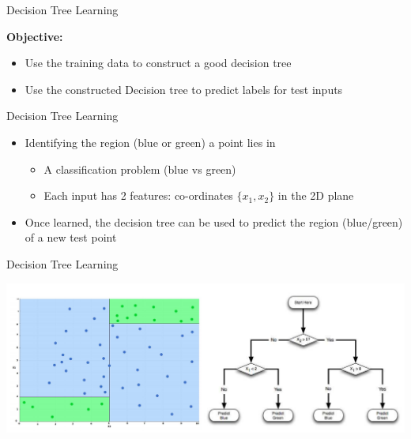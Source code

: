 \documentclass{beamer}
\begin{document}
\begin{frame}{Decision Tree Learning}

    {\bf Objective:} 
    \begin{itemize}
        \item Use the training data to construct a good decision tree
        \item Use the constructed Decision tree to predict labels for test inputs
    \end{itemize}
\end{frame}

\begin{frame}{Decision Tree Learning}
    \begin{itemize}
        \item Identifying the region (blue or green) a point lies in
        \begin{itemize}
            \item A classification problem (blue vs green)
            \item Each input has 2 features: co-ordinates $\{x_1, x_2\}$ in the 2D plane
        \end{itemize}
        \item Once learned, the decision tree can be used to predict the region (blue/green) of a new test point
    \end{itemize}
\end{frame}

\begin{frame}{Decision Tree Learning}
    \begin{center}
        \includegraphics[scale=0.23]{dTreeLearning1.png}
    \end{center}
\end{frame}
\end{document}
